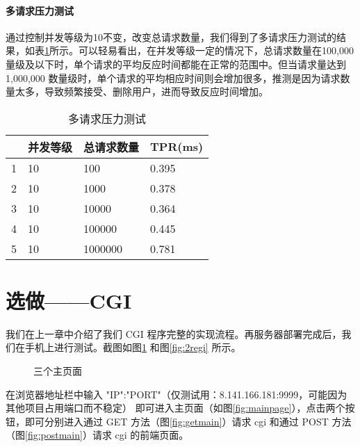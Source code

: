 \paragraph*{多请求压力测试} 通过控制并发等级为10不变，改变总请求数量，我们得到了多请求压力测试的结果，如表\ref{tab:multiple}所示。可以轻易看出，在并发等级一定的情况下，总请求数量在100,000量级及以下时，单个请求的平均反应时间都能在正常的范围中。但当请求量达到1,000,000 数量级时，单个请求的平均相应时间则会增加很多，推测是因为请求数量太多，导致频繁接受、删除用户，进而导致反应时间增加。

\begin{table}[htbp!]
    \centering
    \begin{tabular}{llll}\hline
      & 并发等级 & 总请求数量 & TPR(ms)   \\\hline
    1 & 10      & 100       & 0.395 \\
    2 & 10      & 1000      & 0.378 \\
    3 & 10      & 10000     & 0.364\\
    4 & 10      & 100000    & 0.445\\
    5 & 10      & 1000000   & 0.781\\
    \hline
    \end{tabular}
    \caption{多请求压力测试}\label{tab:multiple}
\end{table}

\section{选做——CGI}

我们在上一章中介绍了我们 CGI 程序完整的实现流程。再服务器部署完成后，我们在手机上进行测试。截图如图\ref{fig:3mains} 和图\ref{fig:2regi} 所示。

\begin{figure}[htbp!]
    \centering
    \caption{三个主页面}\label{fig:3mains}
\end{figure}

在浏览器地址栏中输入 "IP":"PORT"（仅测试用：8.141.166.181:9999，可能因为其他项目占用端口而不稳定） 即可进入主页面（如图\ref{fig:mainpage}），点击两个按钮，即可分别进入通过 GET 方法（图\ref{fig:getmain}）请求 cgi 和通过 POST 方法（图\ref{fig:postmain}）请求 cgi 的前端页面。

